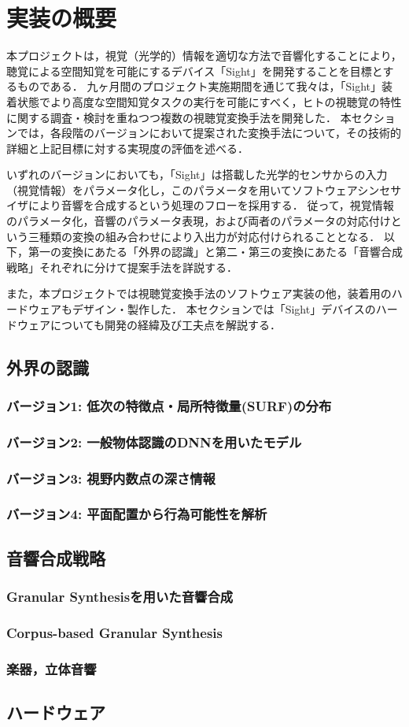 \section{実装の概要}

本プロジェクトは，視覚（光学的）情報を適切な方法で音響化することにより，聴覚による空間知覚を可能にするデバイス「Sight」を開発することを目標とするものである．
九ヶ月間のプロジェクト実施期間を通じて我々は，「Sight」装着状態でより高度な空間知覚タスクの実行を可能にすべく，ヒトの視聴覚の特性に関する調査・検討を重ねつつ複数の視聴覚変換手法を開発した．
本セクションでは，各段階のバージョンにおいて提案された変換手法について，その技術的詳細と上記目標に対する実現度の評価を述べる．

いずれのバージョンにおいても，「Sight」は搭載した光学的センサからの入力（視覚情報）をパラメータ化し，このパラメータを用いてソフトウェアシンセサイザにより音響を合成するという処理のフローを採用する．
従って，視覚情報のパラメータ化，音響のパラメータ表現，および両者のパラメータの対応付けという三種類の変換の組み合わせにより入出力が対応付けられることとなる．
以下，第一の変換にあたる「外界の認識」と第二・第三の変換にあたる「音響合成戦略」それぞれに分けて提案手法を詳説する．

また，本プロジェクトでは視聴覚変換手法のソフトウェア実装の他，装着用のハードウェアもデザイン・製作した．
本セクションでは「Sight」デバイスのハードウェアについても開発の経緯及び工夫点を解説する．

\subsection{外界の認識}
\subsubsection{バージョン1: 低次の特徴点・局所特徴量(SURF)の分布}
\subsubsection{バージョン2: 一般物体認識のDNNを用いたモデル}
\subsubsection{バージョン3: 視野内数点の深さ情報}
\subsubsection{バージョン4: 平面配置から行為可能性を解析}

\subsection{音響合成戦略}
\subsubsection{Granular Synthesisを用いた音響合成}
\subsubsection{Corpus-based Granular Synthesis}
\subsubsection{楽器，立体音響}

\subsection{ハードウェア}

